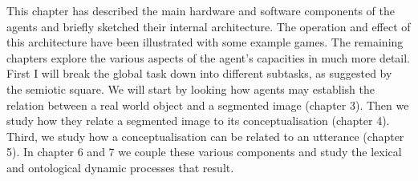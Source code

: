 This chapter has described the main hardware 
and software components of the agents and briefly sketched
their internal architecture. The operation and effect
of this architecture have been 
illustrated with some example games. The remaining chapters explore the 
various aspects of the agent's capacities in much more detail. 
First I will break the global task down into different subtasks, 
as suggested by the semiotic square. We will start by looking how agents 
may establish the relation between a real world object and 
a segmented image (chapter 3). Then we study how they 
relate a segmented image to its conceptualisation (chapter 4). 
Third, we study how a conceptualisation can be related to 
an utterance (chapter 5). In chapter 6 and 7 we couple these
various components and study the lexical and ontological 
dynamic processes that result. 

%

